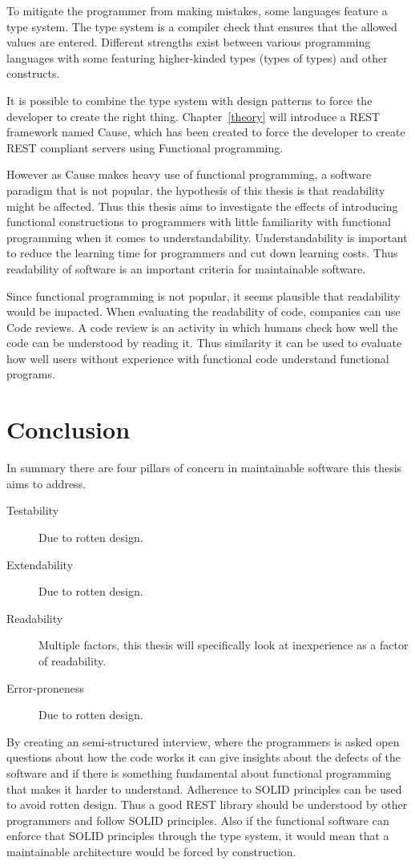 To mitigate the programmer from making mistakes, some languages feature a type
system. The type system is a compiler check that ensures that the allowed values
are entered. Different strengths exist between various programming languages
with some featuring higher-kinded types (types of types) and other constructs.

It is possible to combine the type system with design patterns to force the
developer to create the right thing. Chapter~\ref{theory} will introduce a REST
framework named Cause, which has been created to force the developer to create
REST compliant servers using Functional programming.

However as Cause makes heavy use of functional programming,  a software
paradigm that is not popular, the hypothesis of this thesis is that readability
might be affected. Thus this thesis aims to investigate the effects of
introducing functional constructions to programmers with little familiarity
with functional programming when it comes to understandability.
Understandability is important to reduce the learning time for programmers and
cut down learning costs. Thus readability of software is an important criteria for 
maintainable software.

Since functional programming is not popular, it seems plausible that
readability would be impacted. When evaluating the readability of code,
companies can use Code reviews. A code review is an activity in which humans
check how well the code can be understood by reading it. Thus similarity it can
be used to evaluate how well users without experience with functional code
understand functional programs. 

\section{Conclusion}

In summary there are four pillars of concern in maintainable software this
thesis aims to address.

\begin{description}
    \item[Testability] Due to rotten design.
    \item[Extendability] Due to rotten design.
    \item[Readability] Multiple factors, this thesis will specifically look at 
		inexperience as a factor of readability.
    \item[Error-proneness] Due to rotten design.
\end{description}

By creating an semi-structured interview, where the programmers is asked open
questions about how the code works it can give insights about the defects of
the software and if there is something fundamental about functional programming
that makes it harder to understand. Adherence to SOLID principles can be used
to avoid rotten design. Thus a good REST library should be understood by
other programmers and follow SOLID principles. Also if the functional software
can enforce that SOLID principles through the type system, it would mean that a
maintainable architecture would be forced by construction.
